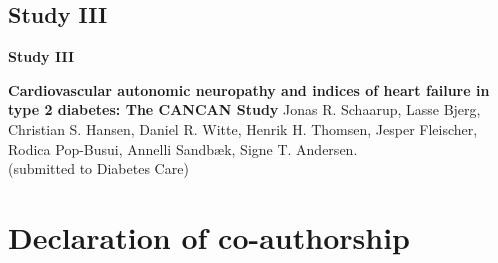 \documentclass[
  a4paper,
  headsepline=true,
  open=left]{scrbook}
\begin{document}
\clearpage
\null
\thispagestyle{empty}
\clearpage






\newpage
\restoregeometry

\hypertarget{study-iii-1}{%
\section{Study III}\label{study-iii-1}}

\textbf{Study III}

\textbf{Cardiovascular autonomic neuropathy and indices of heart failure
in type 2 diabetes: The CANCAN Study} Jonas R. Schaarup, Lasse Bjerg,
Christian S. Hansen, Daniel R. Witte, Henrik H. Thomsen, Jesper
Fleischer, Rodica Pop-Busui, Annelli Sandbæk, Signe T. Andersen.\\
(submitted to Diabetes Care)

\clearpage
\null
\thispagestyle{empty}
\clearpage




\clearpage
\null
\thispagestyle{empty}
\clearpage



\newpage

\restoregeometry

\newpage

\hypertarget{sec-more-results}{%
\chapter{Declaration of co-authorship}\label{sec-more-results}}

\clearpage
\null
\thispagestyle{empty}
\clearpage








\restoregeometry


\backmatter
\end{document}
